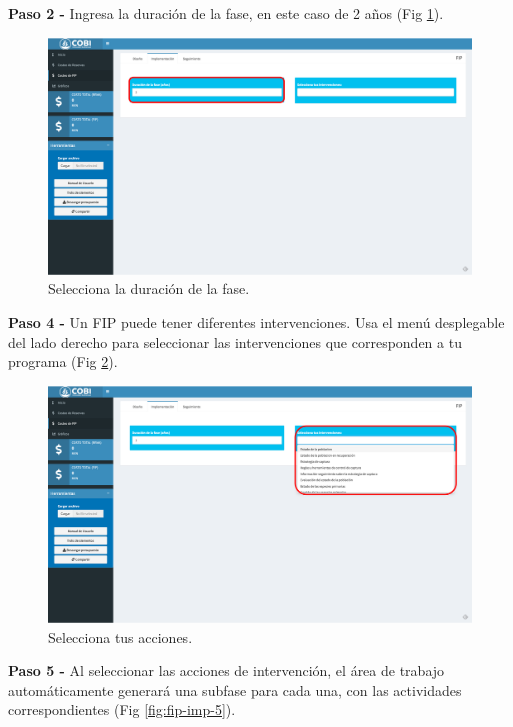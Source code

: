 \documentclass[
]{book}
\begin{document}
\textbf{Paso 2 - } Ingresa la duración de la fase, en este caso de 2 años (Fig \ref{fig:fip-imp-3}).

\begin{figure}
\centering
\includegraphics{images/fip-imp-3.png}
\caption{\label{fig:fip-imp-3}Selecciona la duración de la fase.}
\end{figure}

\textbf{Paso 4 - } Un FIP puede tener diferentes intervenciones. Usa el menú desplegable del lado derecho para seleccionar las intervenciones que corresponden a tu programa (Fig \ref{fig:fip-imp-4}).

\begin{figure}
\centering
\includegraphics{images/fip-imp-4.png}
\caption{\label{fig:fip-imp-4}Selecciona tus acciones.}
\end{figure}

\textbf{Paso 5 - } Al seleccionar las acciones de intervención, el área de trabajo automáticamente generará una subfase para cada una, con las actividades correspondientes (Fig \ref{fig:fip-imp-5}).
\end{document}
